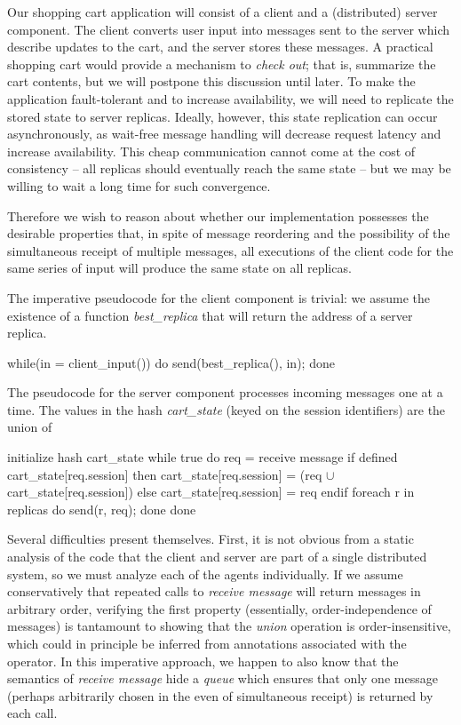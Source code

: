 Our shopping cart application will consist of a client and a (distributed)
server component.  The client converts user input into messages sent to
the server which describe updates to the cart, and the server stores these 
messages.  
A practical shopping cart would provide a mechanism to {\em check out}; that is,
summarize the cart contents, but we will postpone this discussion until later.
To make the application fault-tolerant and to increase availability, 
we will need to replicate the stored state to server replicas.  Ideally, however,
this state replication can occur asynchronously, as wait-free message handling
will decrease request latency and increase availability.  This cheap communication
cannot come at the cost of consistency -- all replicas should eventually reach
the same state -- but we may be willing to wait a long time for such convergence.

Therefore we wish to reason about whether our implementation possesses the desirable 
properties that, in spite of message reordering and the possibility of the simultaneous
receipt of multiple messages, all executions of the client code for the same series of
input will produce the same state on all replicas.  

The imperative pseudocode for the client component is trivial: we assume the existence
of a function {\em best\_replica} that will return the address of a server replica.

\begin{Dedalus}
while(in = client_input()) do
  send(best_replica(), in);
done
\end{Dedalus}


The pseudocode for the server component processes incoming messages one
at a time.  The values in the hash {\em cart\_state} (keyed on the session identifiers) 
are the union of 

\begin{Dedalus}
initialize hash cart_state
while true do
  req = receive message
  if defined cart_state[req.session] then
     cart_state[req.session] =  
       (req \(\cup\) cart_state[req.session]) 
  else 
    cart_state[req.session] = { req } 
  endif
  foreach r in replicas do
    send(r, req);
  done
done
\end{Dedalus}


Several difficulties present themselves.
First, it is not obvious from a static analysis of the code that the client and server are
part of a single distributed system, so we must analyze each of the agents individually.
If we assume conservatively that repeated calls to {\em receive message} will return messages in
arbitrary order, verifying the first property (essentially, order-independence of messages)
is tantamount to showing that the {\em union} operation is
order-insensitive, which could in principle be inferred from annotations associated
with the operator.
In this imperative approach, we happen to also know that the semantics of {\em receive message}
hide a {\em queue} which ensures that only one message (perhaps arbitrarily chosen in the
even of simultaneous receipt) is returned by each call.

